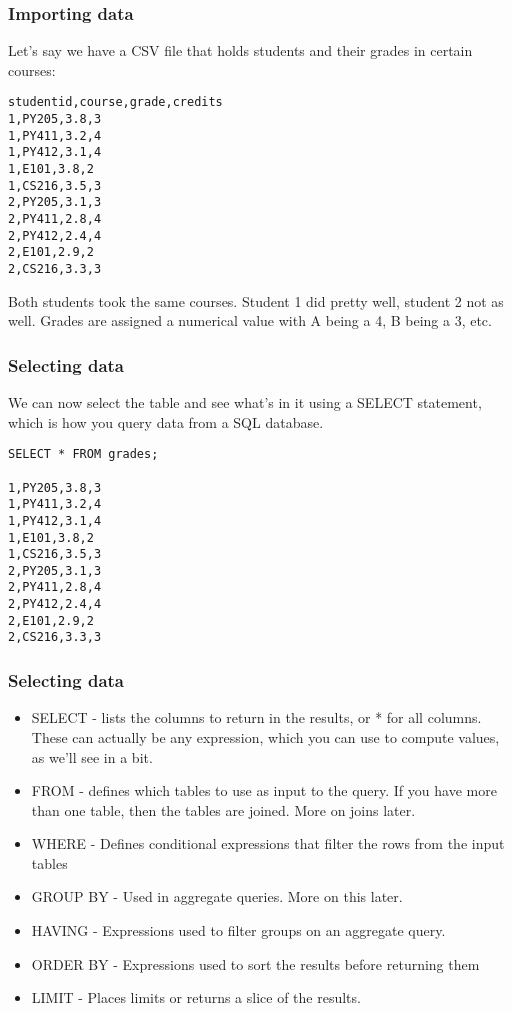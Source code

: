 \begin{frame}[fragile] \frametitle{Importing data}
Let's say we have a CSV file that holds students and their grades in certain courses:
\begin{lstlisting}
studentid,course,grade,credits
1,PY205,3.8,3
1,PY411,3.2,4
1,PY412,3.1,4
1,E101,3.8,2
1,CS216,3.5,3
2,PY205,3.1,3
2,PY411,2.8,4
2,PY412,2.4,4
2,E101,2.9,2
2,CS216,3.3,3
\end{lstlisting}
Both students took the same courses. Student 1 did pretty well, student 2 not as well. Grades are assigned a numerical value with A being a 4, B being a 3, etc.
\end{frame}

\begin{frame}[fragile] \frametitle{Selecting data}
We can now select the table and see what's in it using a SELECT statement, which is how you query data from a SQL database. 
\begin{lstlisting}
SELECT * FROM grades;

1,PY205,3.8,3
1,PY411,3.2,4
1,PY412,3.1,4
1,E101,3.8,2
1,CS216,3.5,3
2,PY205,3.1,3
2,PY411,2.8,4
2,PY412,2.4,4
2,E101,2.9,2
2,CS216,3.3,3
\end{lstlisting}
\end{frame}

\begin{frame}[fragile] \frametitle{Selecting data}
\begin{itemize}
\item SELECT - lists the columns to return in the results, or * for all columns. These can actually be any expression, which you can use to compute values, as we'll see in a bit.
\item FROM - defines which tables to use as input to the query. If you have more than one table, then the tables are joined. More on joins later.
\item WHERE - Defines conditional expressions that filter the rows from the input tables
\item GROUP BY - Used in aggregate queries. More on this later.
\item HAVING - Expressions used to filter groups on an aggregate query.
\item ORDER BY - Expressions used to sort the results before returning them
\item LIMIT - Places limits or returns a slice of the results.
\end{itemize}
\end{frame}

